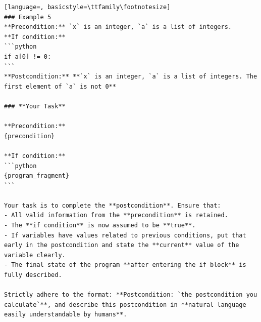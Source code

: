 \documentclass[sigconf]{acmart}
\begin{document}
\begin{tcolorbox}[ colback=gray!10, colframe=black, arc=5pt]
\begin{lstlisting}[language=, basicstyle=\ttfamily\footnotesize]
### Example 5  
**Precondition:** `x` is an integer, `a` is a list of integers.  
**If condition:**  
```python
if a[0] != 0:
```
**Postcondition:** **`x` is an integer, `a` is a list of integers. The first element of `a` is not 0**

### **Your Task**

**Precondition:**  
{precondition}

**If condition:**  
```python
{program_fragment}
```

Your task is to complete the **postcondition**. Ensure that:
- All valid information from the **precondition** is retained.
- The **if condition** is now assumed to be **true**.
- If variables have values related to previous conditions, put that early in the postcondition and state the **current** value of the variable clearly.
- The final state of the program **after entering the if block** is fully described.

Strictly adhere to the format: **Postcondition: `the postcondition you calculate`**, and describe this postcondition in **natural language easily understandable by humans**.

\end{lstlisting}
\end{tcolorbox}
\end{document}
